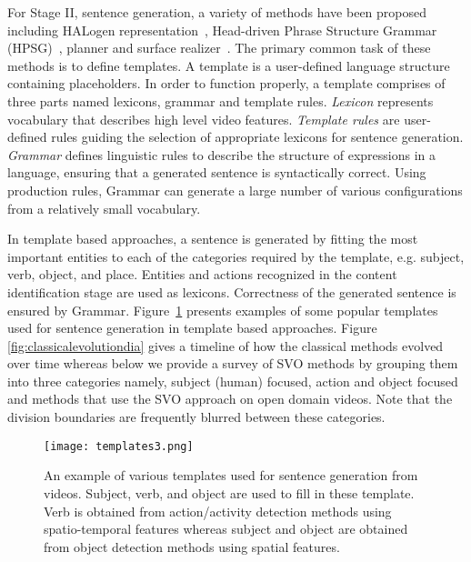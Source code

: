 \documentclass[10pt,journal,compsoc]{IEEEtran}
\begin{document}
For Stage II, sentence generation, a variety of methods have been proposed including HALogen representation~\cite{langkildehalogen}, Head-driven Phrase Structure Grammar (HPSG)~\cite{pollard1994head}, planner and surface realizer~\cite{reiter2000building}. The primary common task of these methods is to define templates. A template is a user-defined language structure containing placeholders. In order to function properly, a template comprises of three parts named lexicons, grammar and template rules. \textit{Lexicon} represents vocabulary that describes high level video features. \textit{Template rules} are user-defined rules guiding the selection of appropriate lexicons for sentence generation. \textit{Grammar} defines linguistic rules to describe the structure of expressions in a language, ensuring that a generated sentence is syntactically correct. Using production rules, Grammar can generate a large number of various configurations from a relatively small vocabulary.   

In template based approaches, a sentence is generated by fitting the most important entities to each of the categories required by the template, e.g. subject, verb, object, and place. Entities and actions recognized in the content identification stage are used as lexicons. Correctness of the generated sentence is ensured by Grammar. Figure~\ref{fig:template} presents examples of some popular templates used for sentence generation in template based approaches. %
Figure \ref{fig:classicalevolutiondia} gives a timeline of how the classical methods evolved over time whereas below we provide a survey of SVO methods by grouping them into three categories namely, subject (human) focused, action and object focused and methods that use the SVO approach on open domain videos. Note that the division boundaries are frequently blurred between these categories. 

\begin{figure}[t] %
   \centering
   \texttt{[image: templates3.png]} 
   \setlength{\belowcaptionskip}{-10pt}
   \caption{An example of various templates used for sentence generation from videos. Subject, verb, and object  are used to fill in these template. Verb is obtained from action/activity detection methods using spatio-temporal features whereas subject and object are obtained from object detection methods using spatial features.}
\label{fig:template}
\end{figure}
\end{document}
